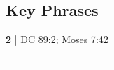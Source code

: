 	
		
		
	
		
		
\subsection{Key Phrases} %
	\label{SALVATION-PHRASES}

	\begin{compactdesc}
	
		\item[temporal salvation] \textbf{2} | \hyperref[DC89-2]{DC 89:2}; \hyperref[MOSES-7-42]{Moses 7:42}
			\begin{compactdesc}
				\item[Bible anchor verses] ---
			\end{compactdesc}
			
	\end{compactdesc}
	
